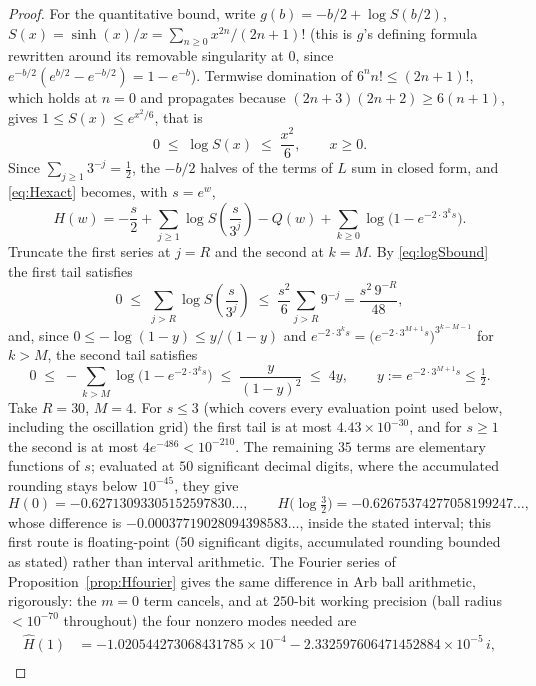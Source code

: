 \documentclass[11pt]{article}
\theoremstyle{definition}
\theoremstyle{remark}
\begin{document}
\begin{proof}
For the quantitative bound, write $g(b) = -b/2 + \log S(b/2)$, $S(x) = \sinh(x)/x = \sum_{n\ge0}
x^{2n}/(2n+1)!$ (this is
$g$'s defining formula rewritten around its removable singularity at $0$, since $e^{-b/2}(e^{b/2}
- e^{-b/2}) = 1-e^{-b}$). Termwise domination of $6^n n! \le (2n+1)!$, which holds at $n=0$ and
propagates because $(2n+3)(2n+2)\ge6(n+1)$, gives $1\le S(x)\le e^{x^2/6}$, that is
\begin{equation}
\label{eq:logSbound}
0 \;\le\; \log S(x) \;\le\; \frac{x^2}{6}, \qquad x\ge0.
\end{equation}
Since $\sum_{j\ge1}3^{-j} = \tfrac12$, the $-b/2$ halves of the terms of $L$ sum in closed form, and
\eqref{eq:Hexact} becomes, with $s = e^w$,
\begin{equation}
\label{eq:Hcomputable}
H(w) = -\frac s2 + \sum_{j\ge1}\log S\!\left(\frac{s}{3^j}\right) - Q(w)
+ \sum_{k\ge0}\log\bigl(1-e^{-2\cdot3^k s}\bigr).
\end{equation}
Truncate the first series at $j=R$ and the second at $k=M$. By \eqref{eq:logSbound} the first tail
satisfies
\[
0 \;\le\; \sum_{j>R}\log S\!\left(\frac{s}{3^j}\right) \;\le\; \frac{s^2}{6}\sum_{j>R}9^{-j}
= \frac{s^2\,9^{-R}}{48},
\]
and, since $0\le-\log(1-y)\le y/(1-y)$ and $e^{-2\cdot3^ks} = \bigl(e^{-2\cdot3^{M+1}s}\bigr)^{3^{k-M-1}}$
for $k>M$, the second tail satisfies
\[
0 \;\le\; -\sum_{k>M}\log\bigl(1-e^{-2\cdot3^ks}\bigr) \;\le\; \frac{y}{(1-y)^2} \;\le\; 4y,
\qquad y:=e^{-2\cdot3^{M+1}s}\le\tfrac12 .
\]
Take $R=30$, $M=4$. For $s\le3$ (which covers every evaluation point used below, including the
oscillation grid) the first tail is at most $4.43\times10^{-30}$, and for $s\ge1$
the second is at most $4e^{-486}<10^{-210}$. The remaining $35$ terms are elementary functions of
$s$; evaluated at $50$ significant decimal digits, where the accumulated rounding stays below
$10^{-45}$, they give
\[
H(0) = -0.62713093305152597830\ldots, \qquad H\bigl(\log\tfrac32\bigr) = -0.62675374277058199247\ldots,
\]
whose difference is $-0.00037719028094398583\ldots$, inside the stated interval; this first route
is floating-point (50 significant digits, accumulated rounding bounded as stated) rather than
interval arithmetic. The Fourier series of Proposition~\ref{prop:Hfourier} gives the same
difference in Arb ball arithmetic, rigorously: the $m=0$ term cancels, and at $250$-bit working
precision (ball radius $<10^{-70}$ throughout) the four nonzero modes needed are
\begin{align*}
\hat H(1) &= -1.020544273068431785\times10^{-4} - 2.332597606471452884\times10^{-5}\,i,\\

\end{align*}
\end{proof}
\end{document}
